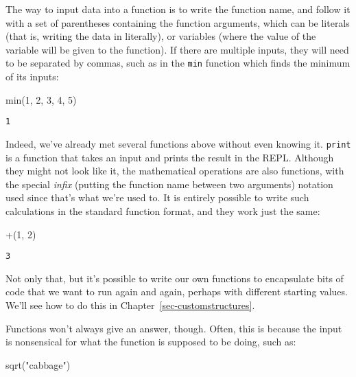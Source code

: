 \documentclass[
  letterpaper,
  DIV=11,
  numbers=noendperiod]{scrreprt}
\newenvironment{Shaded}{\begin{snugshade}}{\end{snugshade}}
\newcommand{\FloatTok}[1]{\textcolor[rgb]{0.68,0.00,0.00}{#1}}
\newcommand{\FunctionTok}[1]{\textcolor[rgb]{0.28,0.35,0.67}{#1}}
\newcommand{\NormalTok}[1]{\textcolor[rgb]{0.00,0.23,0.31}{#1}}
\newcommand{\StringTok}[1]{\textcolor[rgb]{0.13,0.47,0.30}{#1}}
\begin{document}
The way to input data into a function is to write the function name, and
follow it with a set of parentheses containing the function arguments,
which can be literals (that is, writing the data in literally), or
variables (where the value of the variable will be given to the
function). If there are multiple inputs, they will need to be separated
by commas, such as in the \texttt{min} function which finds the minimum
of its inputs:

\begin{Shaded}
\begin{Highlighting}[]
\FunctionTok{min}\NormalTok{(}\FloatTok{1}\NormalTok{, }\FloatTok{2}\NormalTok{, }\FloatTok{3}\NormalTok{, }\FloatTok{4}\NormalTok{, }\FloatTok{5}\NormalTok{)}
\end{Highlighting}
\end{Shaded}

\begin{verbatim}
1
\end{verbatim}

Indeed, we've already met several functions above without even knowing
it. \texttt{print} is a function that takes an input and prints the
result in the REPL. Although they might not look like it, the
mathematical operations are also functions, with the special
\emph{infix} (putting the function name between two arguments) notation
used since that's what we're used to. It is entirely possible to write
such calculations in the standard function format, and they work just
the same:

\begin{Shaded}
\begin{Highlighting}[]
\FunctionTok{+}\NormalTok{(}\FloatTok{1}\NormalTok{, }\FloatTok{2}\NormalTok{)}
\end{Highlighting}
\end{Shaded}

\begin{verbatim}
3
\end{verbatim}

Not only that, but it's possible to write our own functions to
encapsulate bits of code that we want to run again and again, perhaps
with different starting values. We'll see how to do this in
Chapter~\ref{sec-customstructures}.

Functions won't always give an answer, though. Often, this is because
the input is nonsensical for what the function is supposed to be doing,
such as:

\begin{Shaded}
\begin{Highlighting}[]
\FunctionTok{sqrt}\NormalTok{(}\StringTok{"cabbage"}\NormalTok{)}
\end{Highlighting}
\end{Shaded}
\end{document}
